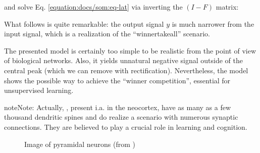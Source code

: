 \documentclass[letterpaper,10pt,english]{jupyterBook}
\let\sphinxpxdimen\pdfpxdimen\else\newdimen\sphinxpxdimen
\begin{document}
\sphinxAtStartPar
and solve Eq. \eqref{equation:docs/som:eq-lat} via inverting the \((I-F)\) matrix:

\begin{sphinxVerbatim}[commandchars=\\\{\}]
 
                      
\PYG{p}{[}\PYG{p}{]}                             
\end{sphinxVerbatim}

\sphinxAtStartPar
What follows is quite remarkable: the output signal \(y\) is much narrower from the input signal, which is a realization of the “winner\sphinxhyphen{}take\sphinxhyphen{}all” scenario.

\noindent{}

\sphinxAtStartPar
The presented model is certainly too simple to be realistic from the point of view of biological networks. Also, it yields unnatural negative signal outside of the central peak (which we can remove with rectification). Nevertheless, the model shows the possible way to achieve the “winner competition”, essential for unsupervised learning.

\begin{sphinxadmonition}{note}{Note:}
\sphinxAtStartPar
Actually, , present i.a. in the neocortex, have as many as a few thousand dendritic spines and do realize a scenario with numerous synaptic connections. They are believed to play a crucial role in learning and cognition.
\end{sphinxadmonition}

\begin{figure}[htbp]
\centering
\capstart

\noindent\sphinxincludegraphics[width=300\sphinxpxdimen]{{smi32-pic}.jpg}
\caption{Image of pyramidal neurons (from )}\label{\detokenize{docs/som:pyr-fig}}\end{figure}
\end{document}
